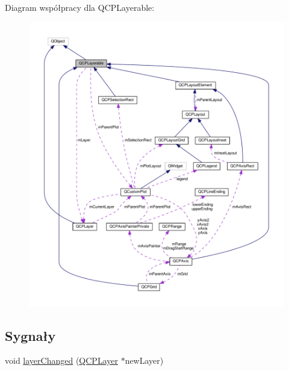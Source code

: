 Diagram współpracy dla Q\+C\+P\+Layerable\+:\nopagebreak
\begin{figure}[H]
\begin{center}
\leavevmode
\includegraphics[width=350pt]{class_q_c_p_layerable__coll__graph}
\end{center}
\end{figure}
\subsection*{Sygnały}
\begin{DoxyCompactItemize}
\item 
void \hyperlink{class_q_c_p_layerable_abbf8657cedea73ac1c3499b521c90eba}{layer\+Changed} (\hyperlink{class_q_c_p_layer}{Q\+C\+P\+Layer} $\ast$new\+Layer)
\end{DoxyCompactItemize}
